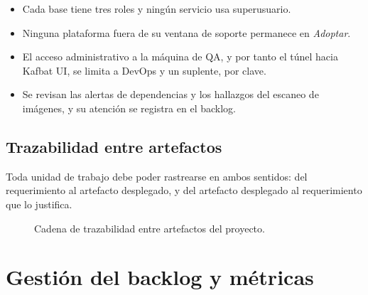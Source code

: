 \documentclass[11pt,a4paper]{article}
\begin{document}
\begin{itemize}
\item Cada base tiene tres roles y ningún servicio usa superusuario.
\item Ninguna plataforma fuera de su ventana de soporte permanece en \emph{Adoptar}.
\item El acceso administrativo a la máquina de QA, y por tanto el túnel hacia Kafbat UI, se limita a DevOps y un suplente, por clave.
\item Se revisan las alertas de dependencias y los hallazgos del escaneo de imágenes, y su atención se registra en el backlog.
\end{itemize}

\subsection{Trazabilidad entre artefactos}
\label{sec:trazabilidad}

Toda unidad de trabajo debe poder rastrearse en ambos sentidos: del requerimiento al artefacto desplegado, y del artefacto desplegado al requerimiento que lo justifica.

\begin{figure}[h!]
\centering
{}
\caption{Cadena de trazabilidad entre artefactos del proyecto.}
\label{fig:trazabilidad}
\end{figure}

\section{Gestión del backlog y métricas}
\label{sec:backlog}
\end{document}
